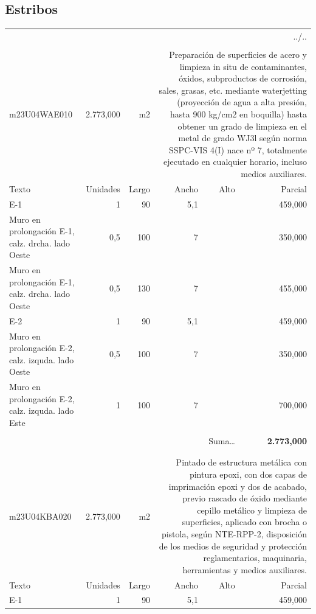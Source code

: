 \documentclass{book}%
\begin{document}
\subsection{Estribos}%
\begin{longtable}{lrrrrr}%
\multicolumn{6}{r}{../..}\\%
\endfoot%
\endlastfoot%
&&&&&\\%
m23U04WAE010& 2.773,000& m2&\multicolumn{3}{p{6cm}}{\scriptsize Preparación de superficies de acero y limpieza in situ de contaminantes, óxidos, subproductos de corrosión, sales, grasas, etc. mediante waterjetting (proyección de agua a alta presión, hasta 900 kg/cm2 en boquilla) hasta obtener un grado de limpieza en el metal de grado WJ3l según norma SSPC-VIS 4(I) nace nº 7, totalmente ejecutado en cualquier horario, incluso medios auxiliares.\normalsize}\\%
Texto&Unidades&Largo&Ancho&Alto&Parcial\\%
\hline%
\multicolumn{1}{p{3.5cm}}{E{-}1}&1&90&5,1&&   459,000\\%
\multicolumn{1}{p{3.5cm}}{Muro en prolongación E{-}1, calz. drcha. lado Oeste}&0,5&100&7&&   350,000\\%
\multicolumn{1}{p{3.5cm}}{Muro en prolongación E{-}1, calz. drcha. lado Oeste}&0,5&130&7&&   455,000\\%
\multicolumn{1}{p{3.5cm}}{E{-}2}&1&90&5,1&&   459,000\\%
\multicolumn{1}{p{3.5cm}}{Muro en prolongación E{-}2, calz. izquda. lado Oeste}&0,5&100&7&&   350,000\\%
\multicolumn{1}{p{3.5cm}}{Muro en prolongación E{-}2, calz. izquda. lado Este}&1&100&7&&   700,000\\%
&&&&&\\%
\multicolumn{5}{r}{Suma\ldots}&\textbf{ 2.773,000}\\%
\hline%
&&&&&\\%
&&&&&\\%
m23U04KBA020& 2.773,000& m2&\multicolumn{3}{p{6cm}}{\scriptsize Pintado de estructura metálica con pintura epoxi, con dos capas de imprimación epoxi y dos de acabado, previo rascado de óxido mediante cepillo metálico y limpieza de superficies, aplicado con brocha o pistola, según NTE-RPP-2, disposición de los medios de seguridad y protección reglamentarios, maquinaria, herramientas y medios auxiliares.\normalsize}\\%
Texto&Unidades&Largo&Ancho&Alto&Parcial\\%
\hline%
\multicolumn{1}{p{3.5cm}}{E{-}1}&1&90&5,1&&   459,000\\%

\end{longtable}
\end{document}
